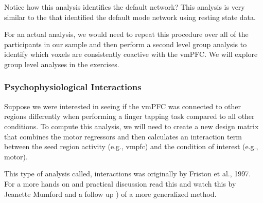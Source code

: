 \documentclass[letterpaper,10pt,english]{sphinxmanual}
\begin{document}
\begin{sphinxVerbatim}[commandchars=\\\{\}]
 
\end{sphinxVerbatim}

\noindent{}

Notice how this analysis identifies the default network? This analysis is very similar to the  that identified the default mode network using resting state data.

For an actual analysis, we would need to repeat this procedure over all of the participants in our sample and then perform a second level group analysis to identify which voxels are consistently coactive with the vmPFC. We will explore group level analyses in the exercises.


\subsubsection{Psychophysiological Interactions}
\label{\detokenize{content/Connectivity:psychophysiological-interactions}}
Suppose we were interested in seeing if the vmPFC was connected to other regions differently when performing a finger tapping task compared to all other conditions. To compute this analysis, we will need to create a new design matrix that combines the motor regressors and then calculates an interaction term between the seed region activity (e.g., vmpfc) and the condition of interest (e.g., motor).

This type of analysis called,  interactions was originally  by Friston et al., 1997. For a more hands on and practical discussion read this  and watch this  by Jeanette Mumford and a follow up ) of a more generalized method.

\begin{sphinxVerbatim}[commandchars=\\\{\}]
  \PYG{p}{[}\PYG{p}{]}
\end{sphinxVerbatim}
\end{document}
